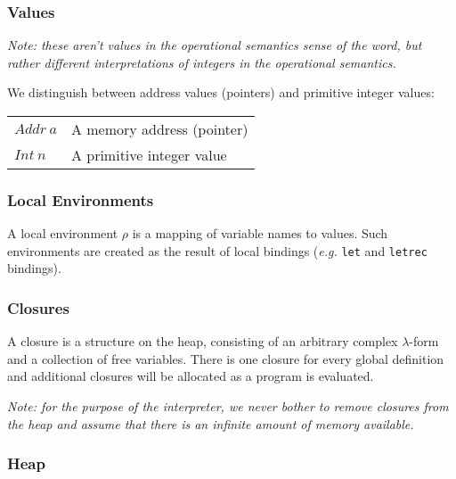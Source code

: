 \documentclass[10pt,a4paper]{exam} %
\begin{document}
\subsubsection{Values}

\emph{Note: these aren't values in the operational semantics sense of the word, but rather different interpretations of integers in the operational semantics.}

We distinguish between address values (pointers) and primitive integer values:
\begin{center}
\begin{tabular}{p{1cm}p{6cm}}
$\mathit{Addr}~a$ & A memory address (pointer) \\
$\mathit{Int}~n$  & A primitive integer value
\end{tabular}
\end{center}

\subsubsection{Local Environments}

A local environment $\rho$ is a mapping of variable names to values. Such environments are created as the result of local bindings (\emph{e.g.} \texttt{let} and \texttt{letrec} bindings).

\subsubsection{Closures}

A closure is a structure on the heap, consisting of an arbitrary complex $\lambda$-form and a collection of free variables. There is one closure for every global definition and additional closures will be allocated as a program is evaluated.

\emph{Note: for the purpose of the interpreter, we never bother to remove closures from the heap and assume that there is an infinite amount of memory available.}

\subsubsection{Heap}
\end{document}
